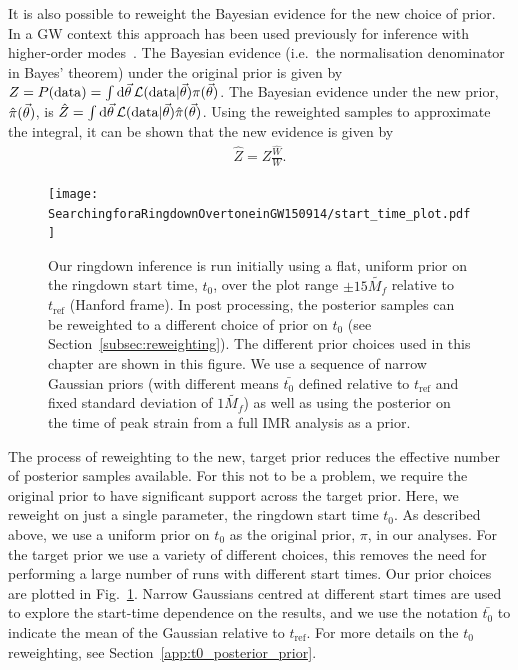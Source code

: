 It is also possible to reweight the Bayesian evidence for the new choice of prior.
In a GW context this approach has been used previously for inference with higher-order modes~\cite{Payne:2019wmy}.
The Bayesian evidence (i.e.\ the normalisation denominator in Bayes' theorem) under the original prior is given by $Z=P(\mathrm{data})=\int\mathrm{d}\vec{\theta}\,\mathcal{L}(\mathrm{data}|\vec{\theta})\pi(\vec{\theta})$.
The Bayesian evidence under the new prior, $\hat{\pi}(\vec{\theta})$, is $\hat{Z}=\int\mathrm{d}\vec{\theta}\,\mathcal{L}(\mathrm{data}|\vec{\theta})\hat{\pi}(\vec{\theta})$. Using the reweighted samples to approximate the integral, it can be shown that the new evidence is given by
\begin{align}\label{eq:new_evidence}
	\hat{Z} = Z\frac{\hat{W}}{W}.
\end{align}

\begin{figure}[t]
    \centering
    \texttt{[image: SearchingforaRingdownOvertoneinGW150914/start\_time\_plot.pdf]}
    \caption[Priors on the ringdown start time used for the GW150914 analysis]{ 
    Our ringdown inference is run initially using a flat, uniform prior on the ringdown start time, $t_0$, over the plot range $\pm 15 \tilde{M_f}$ relative to $t_\mathrm{ref}$ (Hanford frame).
    In post processing, the posterior samples can be reweighted to a different choice of prior on $t_0$ (see Section~\ref{subsec:reweighting}). 
    The different prior choices used in this chapter are shown in this figure. 
    We use a sequence of narrow Gaussian priors (with different means $\bar{t_0}$ defined relative to $t_\mathrm{ref}$ and fixed standard deviation of $1\tilde{M_f}$) as well as using the posterior on the time of peak strain from a full IMR analysis as a prior.
    }
    \label{fig:start_time}
\end{figure}

The process of reweighting to the new, target prior reduces the effective number of posterior samples available.
For this not to be a problem, we require the original prior to have significant support across the target prior.
Here, we reweight on just a single parameter, the ringdown start time $t_0$.
As described above, we use a uniform prior on $t_0$ as the original prior, $\pi$, in our analyses.
For the target prior we use a variety of different choices, this removes the need for performing a large number of runs with different start times. 
Our prior choices are plotted in Fig.~\ref{fig:start_time}.
Narrow Gaussians centred at different start times are used to explore the start-time dependence on the results, and we use the notation $\bar{t_0}$ to indicate the mean of the Gaussian relative to $t_\mathrm{ref}$. 
For more details on the $t_0$ reweighting, see Section~\ref{app:t0_posterior_prior}.

